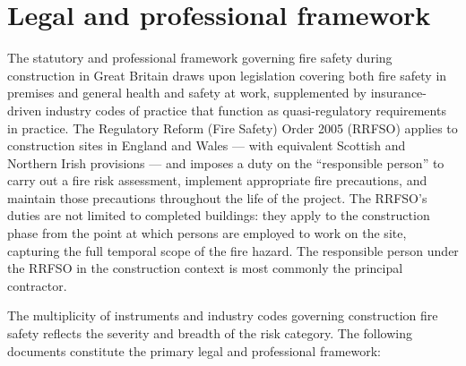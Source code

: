 \section{Legal and professional framework}

The statutory and professional framework governing fire safety during construction in Great Britain draws upon legislation covering both fire safety in premises and general health and safety at work, supplemented by insurance-driven industry codes of practice that function as quasi-regulatory requirements in practice. The Regulatory Reform (Fire Safety) Order 2005 (RRFSO) applies to construction sites in England and Wales --- with equivalent Scottish and Northern Irish provisions --- and imposes a duty on the ``responsible person'' to carry out a fire risk assessment, implement appropriate fire precautions, and maintain those precautions throughout the life of the project. The RRFSO's duties are not limited to completed buildings: they apply to the construction phase from the point at which persons are employed to work on the site, capturing the full temporal scope of the fire hazard. The responsible person under the RRFSO in the construction context is most commonly the principal contractor.

The multiplicity of instruments and industry codes governing construction fire safety reflects the severity and breadth of the risk category. The following documents constitute the primary legal and professional framework:

